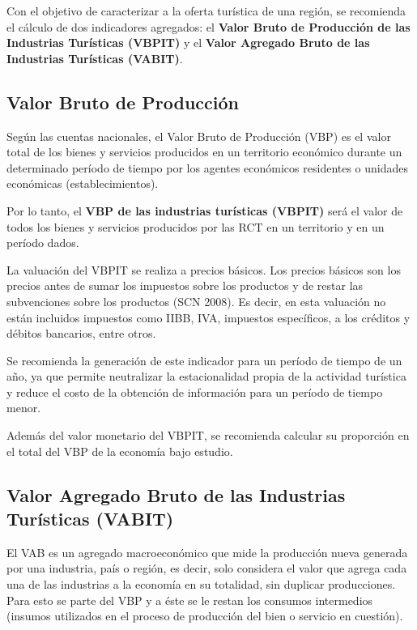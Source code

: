\documentclass[
  openany]{book}
\begin{document}
Con el objetivo de caracterizar a la oferta turística de una región, se recomienda el cálculo de dos indicadores agregados: el \textbf{Valor Bruto de Producción de las Industrias Turísticas (VBPIT)} y el \textbf{Valor Agregado Bruto de las Industrias Turísticas (VABIT)}.

\hypertarget{valor-bruto-de-produccion}{%
\subsection{Valor Bruto de Producción}\label{valor-bruto-de-produccion}}

Según las cuentas nacionales, el Valor Bruto de Producción (VBP) es el valor total de los bienes y servicios producidos en un territorio económico durante un determinado período de tiempo por los agentes económicos residentes o unidades económicas (establecimientos).

Por lo tanto, el \textbf{VBP de las industrias turísticas (VBPIT)} será el valor de todos los bienes y servicios producidos por las RCT en un territorio y en un período dados.

La valuación del VBPIT se realiza a precios básicos. Los precios básicos son los precios antes de sumar los impuestos sobre los productos y de restar las subvenciones sobre los productos (SCN 2008). Es decir, en esta valuación no están incluidos impuestos como IIBB, IVA, impuestos específicos, a los créditos y débitos bancarios, entre otros.

Se recomienda la generación de este indicador para un período de tiempo de un año, ya que permite neutralizar la estacionalidad propia de la actividad turística y reduce el costo de la obtención de información para un período de tiempo menor.

Además del valor monetario del VBPIT, se recomienda calcular su proporción en el total del VBP de la economía bajo estudio.

\hypertarget{valor-agregado-bruto-de-las-industrias-turuxedsticas-vabit}{%
\subsection{Valor Agregado Bruto de las Industrias Turísticas (VABIT)}\label{valor-agregado-bruto-de-las-industrias-turuxedsticas-vabit}}

El VAB es un agregado macroeconómico que mide la producción nueva generada por una industria, país o región, es decir, solo considera el valor que agrega cada una de las industrias a la economía en su totalidad, sin duplicar producciones. Para esto se parte del VBP y a éste se le restan los consumos intermedios (insumos utilizados en el proceso de producción del bien o servicio en cuestión).
\end{document}
